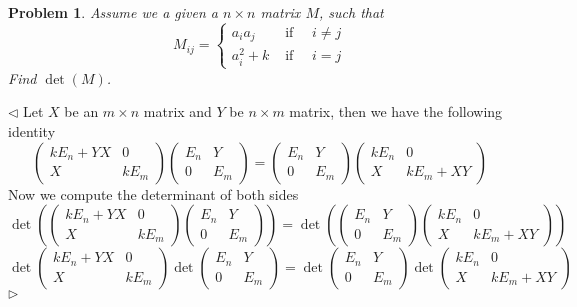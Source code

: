 \documentclass[12pt]{article}
\newtheorem{problem}{Problem}[subsection]
\newenvironment{solution}{\par $\triangleleft$}{$\triangleright$}
\begin{document}
\begin{problem} Assume we a given a $n\times n$ matrix $M$, such that 
$$
M_{ij}=\begin{cases}a_ia_j&\mbox{ if }\quad i\neq j\\a_i^2+k&\mbox{ if }\quad i=j\end{cases}
$$
Find $\det(M)$.
\end{problem}
\begin{solution} 
Let $X$ be an $m\times n$ matrix and $Y$ be $n\times m$ matrix, then we have the following identity
$$
\begin{pmatrix}kE_n+YX&0\\X&kE_m\end{pmatrix}\begin{pmatrix}E_n&Y\\0&E_m\end{pmatrix}
=\begin{pmatrix}E_n&Y\\0&E_m\end{pmatrix}\begin{pmatrix}kE_n&0\\X&kE_m+XY\end{pmatrix}
$$
Now we compute the determinant of both sides
$$
\det\left(\begin{pmatrix}kE_n+YX&0\\X&kE_m\end{pmatrix}\begin{pmatrix}E_n&Y\\0&E_m\end{pmatrix}\right)
=
\det\left(\begin{pmatrix}E_n&Y\\0&E_m\end{pmatrix}\begin{pmatrix}kE_n&0\\X&kE_m+XY\end{pmatrix}\right)
$$
$$
\det\begin{pmatrix}kE_n+YX&0\\X&kE_m\end{pmatrix}\det\begin{pmatrix}E_n&Y\\0&E_m\end{pmatrix}
=
\det\begin{pmatrix}E_n&Y\\0&E_m\end{pmatrix}\det\begin{pmatrix}kE_n&0\\X&kE_m+XY\end{pmatrix}
$$
\end{solution}
\end{document}
